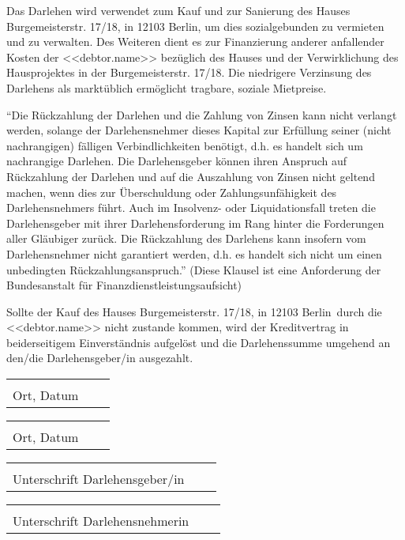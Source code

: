 \documentclass[]{scrartcl}
\newcommand{\addressStreet}{Burgemeisterstr. 17/18}
\newcommand{\addressWithZIP}{\addressStreet, in 12103 Berlin}
\begin{document}
\begin{contract}
Das Darlehen wird verwendet zum Kauf und zur Sanierung des Hauses \addressWithZIP, um dies sozialgebunden zu vermieten und zu verwalten. Des Weiteren dient es zur Finanzierung anderer anfallender Kosten der <<debtor.name>> bezüglich des Hauses und der Verwirklichung des Hausprojektes in der \addressStreet. Die niedrigere Verzinsung des Darlehens als marktüblich ermöglicht tragbare, soziale Mietpreise.

“Die Rückzahlung der Darlehen und die Zahlung von Zinsen kann nicht verlangt werden, solange der Darlehensnehmer dieses Kapital zur Erfüllung seiner (nicht nachrangigen) fälligen Verbindlichkeiten benötigt, d.h. es handelt sich um nachrangige Darlehen. Die Darlehensgeber können ihren Anspruch auf Rückzahlung der Darlehen und auf die Auszahlung von Zinsen nicht geltend machen, wenn dies zur Überschuldung oder Zahlungsunfähigkeit des Darlehensnehmers führt. Auch im Insolvenz- oder Liquidationsfall treten die Darlehensgeber mit ihrer Darlehensforderung im Rang hinter die Forderungen aller Gläubiger zurück. Die Rückzahlung des Darlehens kann insofern vom Darlehensnehmer nicht garantiert werden, d.h. es handelt sich nicht um einen unbedingten Rückzahlungsanspruch.” (Diese Klausel ist eine Anforderung der Bundesanstalt für Finanzdienstleistungsaufsicht)

Sollte der Kauf des Hauses \addressWithZIP\ durch die <<debtor.name>> nicht zustande kommen, wird der Kreditvertrag in beiderseitigem Einverständnis aufgelöst und die Darlehenssumme umgehend an den/die Darlehensgeber/in ausgezahlt.

\end{contract}

\vspace{1,5 cm}
\begin{tabular}{p{7cm}p{.5cm}l}
\dotfill \\
Ort, Datum
\end{tabular}%
\hfill
\begin{tabular}{p{7cm}p{.5cm}l}
\dotfill \\
Ort, Datum
\end{tabular}%

\vspace{1,5 cm}
\begin{tabular}{p{7cm}p{.5cm}l}
\dotfill \\
Unterschrift Darlehensgeber/in
\end{tabular}%
\hfill
\begin{tabular}{p{7cm}p{.5cm}l}
\dotfill \\
Unterschrift Darlehensnehmerin
\end{tabular}%
\end{document}
